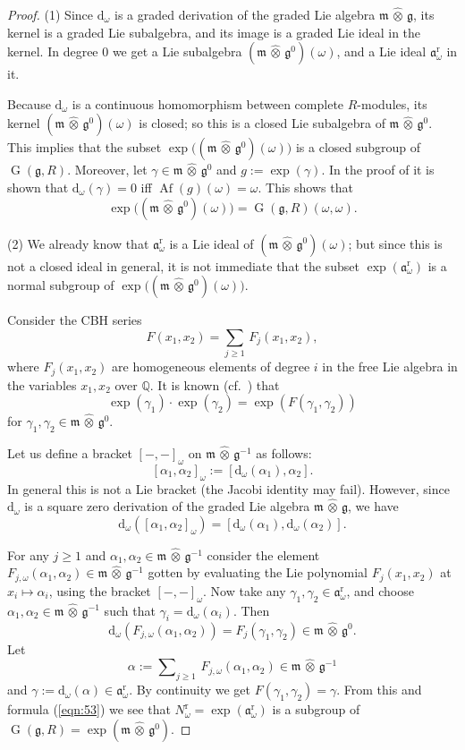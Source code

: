 \documentclass[a4paper,10pt]{amsart}
\theoremstyle{definition}
\numberwithin{equation}{section}
\newcommand{\opn}{\operatorname}
\newcommand{\mfrak}[1]{\mathfrak{#1}}
\newcommand{\mrm}[1]{\mathrm{#1}}
\newcommand{\mbb}[1]{\mathbb{#1}}
\newcommand{\bosum}{\sum\nolimits}
\newcommand{\what}[1]{\widehat{#1}}
\newcommand{\hatotimes}{\, \what{\otimes} \,}
\newcommand{\hot}{\hatotimes}
\newcommand{\Q}{\mbb{Q}}
\newcommand{\g}{\mfrak{g}}
\newcommand{\m}{\mfrak{m}}
\renewcommand{\a}{\mfrak{a}}
\renewcommand{\d}{\mrm{d}}
\newcommand{\om}{\omega}
\newcommand{\ga}{\gamma}
\newcommand{\al}{\alpha}
\begin{document}
\begin{proof}
(1) Since $\d_{\om}$ is a graded derivation of the  graded Lie
algebra $\m \hatotimes \g$, its kernel is a graded Lie subalgebra, and its image
is a graded Lie ideal in the kernel. In degree $0$ we get a Lie subalgebra 
$(\m \hatotimes \g^0)(\om)$, and a Lie ideal $\a^{\mrm{r}}_{\om}$ in it.

Because $\d_{\om}$ is a continuous homomorphism between complete $R$-modules,
its kernel $(\m \hatotimes \g^0)(\om)$ is closed; so this is a closed Lie
subalgebra of $\m \hatotimes \g^0$. This implies that the subset 
$\exp \bigl( (\m \hatotimes \g^0)(\om) \bigr)$ is a closed subgroup of 
$\opn{G}(\g, R)$. 
Moreover, let $\ga \in \m \hot \g^0$ and $g := \exp(\ga)$.  
In the proof of  \cite[Theorem 2.2]{Ge} it is shown that 
$\d_{\om}(\gamma) = 0$ iff 
$\opn{Af}(g)(\om) = \om$. This shows that  
\[ \exp \bigl( (\m \hatotimes \g^0)(\om) \bigr) = 
\opn{G}(\g, R)(\om, \om) . \]

\medskip \noindent
(2) We already know that $\a^{\mrm{r}}_{\om}$ is a Lie ideal of 
$(\m \hatotimes \g^0)(\om)$; but since this is not a closed ideal in general,
it is not immediate that the subset $\exp(\a^{\mrm{r}}_{\om})$ is a normal
subgroup of 
$\exp \bigl( (\m \hatotimes \g^0)(\om) \bigr)$.

Consider the CBH series
\[ F(x_1, x_2) = \sum_{j \geq 1}\, F_j(x_1, x_2) , \]
where $F_j(x_1, x_2)$ are homogeneous elements of degree $i$ in the 
free Lie algebra in the variables $x_1, x_2$ over $\Q$. 
It is known (cf.\ \cite{Bo}) that 
\begin{equation} \label{eqn:53}
\exp(\ga_1) \cdot \exp(\ga_2)  = \exp(F(\ga_1, \ga_2))
\end{equation}
for $\ga_1, \ga_2 \in \m \hot \g^0$. 

Let us define a bracket $[-,-]_{\om}$ on $\m \hot \g^{-1}$ as follows:
\[ [\al_1, \al_2]_{\om} := [ \d_{\om}(\al_1), \al_2] . \]
In general this is not a Lie bracket (the Jacobi identity may fail). However,
since $\d_{\om}$ is a square zero derivation of
the graded Lie algebra $\m \hot \g$, we have 
\[ \d_{\om}([\al_1, \al_2]_{\om}) = [\d_{\om}(\al_1), \d_{\om}(\al_2)] . \]

For any $j \geq 1$ and $\al_1, \al_2 \in \m \hot \g^{-1}$  consider 
the element 
$F_{j, \om}(\al_1, \al_2) \in \m \hot \g^{-1}$
gotten by evaluating the Lie polynomial $F_j(x_1, x_2)$
at $x_i \mapsto \al_i$, using the bracket $[-,-]_{\om}$. 
Now take any $\ga_1, \ga_2 \in \a^{\mrm{r}}_{\om}$, and choose 
$\al_1, \al_2 \in \m \hot \g^{-1}$ such that $\ga_i = \d_{\om}(\al_i)$. Then 
\[ \d_{\om}(F_{j, \om}(\al_1, \al_2)) = 
F_j(\ga_1, \ga_2) \in \m \hot \g^0 . \]
Let 
\[ \al :=  \bosum_{j \geq 1}\,  F_{j, \om}(\al_1, \al_2) \in 
\m \hot \g^{-1}  \]
and $\ga := \d_{\om} (\al) \in \a^{\mrm{r}}_{\om}$. 
By continuity we get
$F(\ga_1, \ga_2) = \ga$. 
{}From this and formula (\ref{eqn:53}) we see that 
$N^{\mrm{r}}_{\om} = \exp(\a^{\mrm{r}}_{\om})$ is a
subgroup of $\opn{G}(\g, R) = \exp (\m \hatotimes \g^0)$.


\end{proof}
\end{document}
